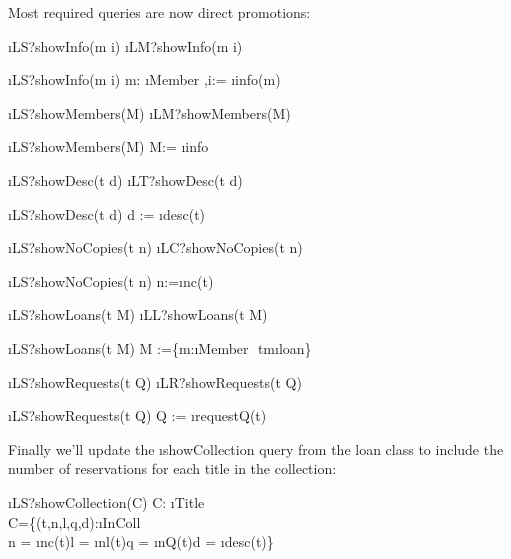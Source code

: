 \documentclass[12pt,a4paper]{article}
\begin{document}
\bigskip\noindent Most required queries are now direct promotions:
\begin{showspecs}
	\begin{spec}{\i{LS?showInfo(m \to i)}}
		\i{LM?showInfo(m \to i)}
	\end{spec}
\showbeside
	\begin{spec}[\equiv]{\i{LS?showInfo(m \to i)}}
		m: \i{Member} \sep i:= \i{info}(m)
	\end{spec}
\showmore
	\begin{spec}{\i{LS?showMembers(\to M)}}
		\i{LM?showMembers(\to M)}
	\end{spec}
\showbeside
	\begin{spec}[\equiv]{\i{LS?showMembers(\to M)}}
		M:= \i{info}
	\end{spec}
\showmore
	\begin{spec}{\i{LS?showDesc(t \to d)}}
		\i{LT?showDesc(t \to d)}
	\end{spec}
\showbeside
	\begin{spec}[\equiv]{\i{LS?showDesc(t \to d)}}
		d := \i{desc}(t)
	\end{spec}
\showmore
	\begin{spec}{\i{LS?showNoCopies(t \to n)}}
		\i{LC?showNoCopies(t \to n)}
	\end{spec}	
\showbeside
	\begin{spec}[\equiv]{\i{LS?showNoCopies(t \to n)}}
		n:=\i{nc}(t)
	\end{spec}
\showmore
	\begin{spec}{\i{LS?showLoans(t \to M)}}
		\i{LL?showLoans(t \to M)}
	\end{spec}
\showbeside
	\begin{spec}[\equiv]{\i{LS?showLoans(t \to M)}}
		M :=\{m:\i{Member}\,\bullet\, t\mapsto m\in \i{loan}\}
	\end{spec}
\showmore
	\begin{spec}{\i{LS?showRequests(t \to Q)}}
		\i{LR?showRequests(t \to Q)}
	\end{spec}
\showbeside
	\begin{spec}[\equiv]{\i{LS?showRequests(t \to Q)}}
		Q := \i{requestQ}(t)
	\end{spec}
\end{showspecs}

\medskip\noindent
Finally we'll update the \i{showCollection} query from the loan class to include the number of reservations for each title in the collection:
\begin{showspecs}
	\begin{spec}{\i{LS?showCollection(\to C)}}
		C: \i{Title}\pfun{}\!\times{}\!\times{}\!\times{}\\
		C\!=\!\{(t,n,l,q,d):\i{InColl}\times{}\!\times{}\!\times{}\!\times{}\;\bullet\\
        \hspace{1cm} n = \i{nc}(t)\wedge l = \i{nl}(t)\wedge q = \i{nQ}(t)\wedge d = \i{desc}(t)\}
	\end{spec}
\end{showspecs}
\end{document}
